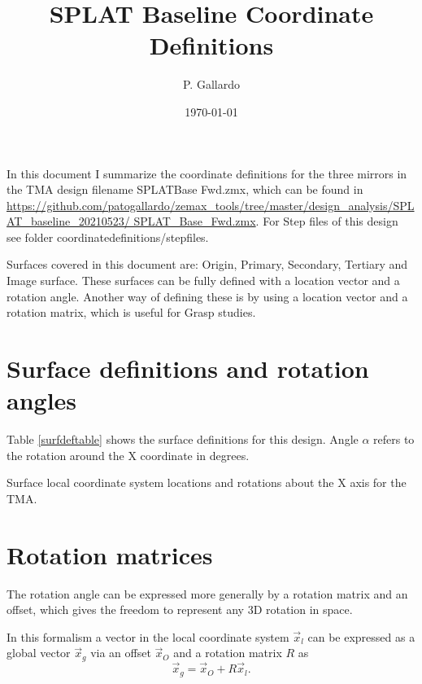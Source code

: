 \documentclass[]{article}
\title{SPLAT Baseline Coordinate Definitions}
\author{P. Gallardo}
\date{\today}
\begin{document}
\maketitle

In this document I summarize the coordinate
definitions for the three mirrors in the TMA design 
filename  SPLAT\textunderscore Base \textunderscore Fwd.zmx, which can be found in \url{https://github.com/patogallardo/zemax_tools/tree/master/design_analysis/SPLAT_baseline_20210523/
SPLAT_Base_Fwd.zmx}. For Step files of this design see folder coordinate\textunderscore definitions/step\textunderscore files. 

Surfaces covered in this document are: Origin, Primary, Secondary, Tertiary and Image surface. These surfaces can be fully defined with a location vector and a rotation angle. Another way of defining these is by using a location vector and a rotation matrix, which is useful for Grasp studies.

\section{Surface definitions and rotation angles}

Table \ref{surfdeftable} shows the surface definitions for this design. Angle $\alpha$ refers to the rotation around the X coordinate in degrees.

\begin{table}
\begin{center}
	
\end{center}

\caption{Surface local coordinate system locations and rotations about the X axis for the TMA.}
\label{surfdeftable}
\end{table}


\section{Rotation matrices}
The rotation angle can be expressed more generally by a rotation matrix and an offset,
 which gives the freedom to represent any 3D rotation in space.
 
In this formalism a vector in the local coordinate system $\vec x_l$ can be expressed as a global vector $\vec x_g$ via an offset $\vec x_O$ and a rotation matrix $R$ as \begin{equation}
\vec x_g = \vec x_O + R\vec x_l.
\end{equation} 
\end{document}
